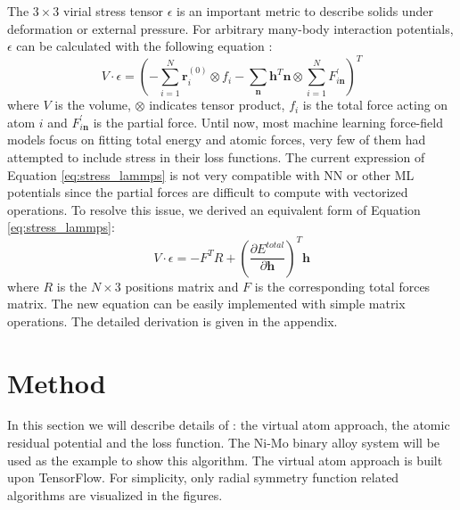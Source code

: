 \documentclass[preprint]{revtex4-2}
\begin{document}
The $3 \times 3$ virial stress tensor $\epsilon$ is an important metric to 
describe solids under deformation or external pressure. For arbitrary many-body 
interaction potentials, $\epsilon$ can be calculated with the following equation
\cite{lammps_stress}:
\begin{equation}
\label{eq:stress_lammps}
V \cdot \epsilon = \left(-\sum_{i=1}^{N}{\mathbf{r}_i^{(0)} \otimes f_i} - 
\sum_{\mathbf{n}}{\mathbf{h}^T\mathbf{n}} \otimes 
\sum_{i=1}^{N}{F^{\prime}_{i\mathbf{n}}}
\right)^T
\end{equation}
where $V$ is the volume, $\otimes$ indicates tensor product, $f_i$ is the total 
force acting on atom $i$ and $F^{\prime}_{i\mathbf{n}}$ is the partial force. 
Until now, most machine learning force-field models focus on fitting total 
energy and atomic forces, very few of them\cite{DeePMD,DeePMD_rl,DeePMD_kit} had 
attempted to include stress in their loss functions. 
The current expression of Equation \ref{eq:stress_lammps} is not very compatible 
with NN or other ML potentials since the partial forces are difficult to compute 
with vectorized operations. To resolve this issue, we derived an equivalent form 
of Equation \ref{eq:stress_lammps}:
\begin{equation}
\label{eq:stress}
V \cdot \epsilon = -F^{T} R + 
\left(\frac{\partial E^{total}}{\partial \mathbf{h}}\right)^T \mathbf{h}
\end{equation}
where $R$ is the $N \times 3$ positions matrix and $F$ is the 
corresponding total forces matrix. The new equation can be easily implemented 
with simple matrix operations. The detailed derivation is given in the appendix.

% 
%
\section{Method}
\label{section:method}

\newcommand{\nmax}{
    N_{\mathrm{Ni}}^{\mathrm{max}}+N_{\mathrm{Mo}}^{\mathrm{max}}
}
\newcommand{\nijmax}{N_{ij}^{\mathrm{max}}}
\newcommand{\nijkmax}{N_{ijk}^{\mathrm{max}}}

In this section we will describe details of \tensoralloy{}: the virtual atom 
approach, the atomic residual potential and the loss function. 
The Ni-Mo binary alloy system will be used as the example to show this 
algorithm. The virtual atom approach is built upon TensorFlow. For simplicity, 
only radial symmetry function related algorithms are visualized in the figures.
\end{document}
